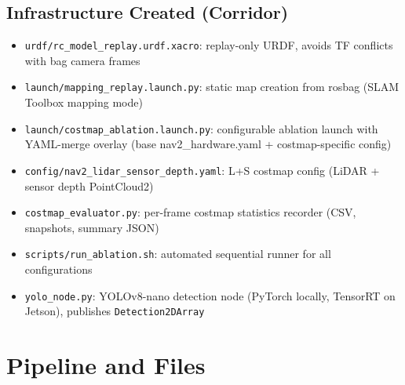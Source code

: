 \documentclass[11pt,a4paper]{article}
\begin{document}
\subsection{Infrastructure Created (Corridor)}

\begin{itemize}[nosep]
  \item \texttt{urdf/rc\_model\_replay.urdf.xacro}: replay-only URDF,
    avoids TF conflicts with bag camera frames
  \item \texttt{launch/mapping\_replay.launch.py}: static map creation
    from rosbag (SLAM Toolbox mapping mode)
  \item \texttt{launch/costmap\_ablation.launch.py}: configurable
    ablation launch with YAML-merge overlay (base nav2\_hardware.yaml +
    costmap-specific config)
  \item \texttt{config/nav2\_lidar\_sensor\_depth.yaml}: L+S costmap
    config (LiDAR + sensor depth PointCloud2)
  \item \texttt{costmap\_evaluator.py}: per-frame costmap statistics
    recorder (CSV, snapshots, summary JSON)
  \item \texttt{scripts/run\_ablation.sh}: automated sequential runner
    for all configurations
  \item \texttt{yolo\_node.py}: YOLOv8-nano detection node (PyTorch
    locally, TensorRT on Jetson), publishes \texttt{Detection2DArray}
\end{itemize}

\section{Pipeline and Files}
\label{sec:files}
\end{document}
